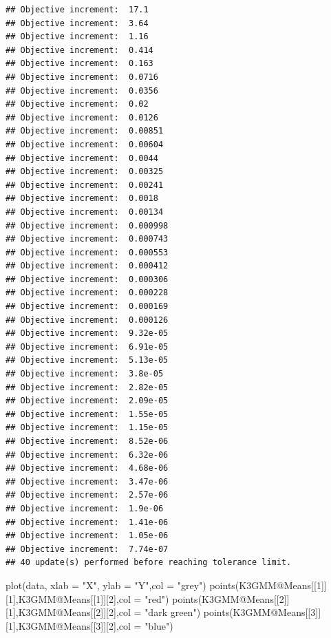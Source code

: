 \documentclass[
]{article}
\newenvironment{Shaded}{\begin{snugshade}}{\end{snugshade}}
\newcommand{\AttributeTok}[1]{\textcolor[rgb]{0.77,0.63,0.00}{#1}}
\newcommand{\DecValTok}[1]{\textcolor[rgb]{0.00,0.00,0.81}{#1}}
\newcommand{\FunctionTok}[1]{\textcolor[rgb]{0.00,0.00,0.00}{#1}}
\newcommand{\NormalTok}[1]{#1}
\newcommand{\SpecialCharTok}[1]{\textcolor[rgb]{0.00,0.00,0.00}{#1}}
\newcommand{\StringTok}[1]{\textcolor[rgb]{0.31,0.60,0.02}{#1}}
\begin{document}
\begin{verbatim}
## Objective increment:  17.1 
## Objective increment:  3.64 
## Objective increment:  1.16 
## Objective increment:  0.414 
## Objective increment:  0.163 
## Objective increment:  0.0716 
## Objective increment:  0.0356 
## Objective increment:  0.02 
## Objective increment:  0.0126 
## Objective increment:  0.00851 
## Objective increment:  0.00604 
## Objective increment:  0.0044 
## Objective increment:  0.00325 
## Objective increment:  0.00241 
## Objective increment:  0.0018 
## Objective increment:  0.00134 
## Objective increment:  0.000998 
## Objective increment:  0.000743 
## Objective increment:  0.000553 
## Objective increment:  0.000412 
## Objective increment:  0.000306 
## Objective increment:  0.000228 
## Objective increment:  0.000169 
## Objective increment:  0.000126 
## Objective increment:  9.32e-05 
## Objective increment:  6.91e-05 
## Objective increment:  5.13e-05 
## Objective increment:  3.8e-05 
## Objective increment:  2.82e-05 
## Objective increment:  2.09e-05 
## Objective increment:  1.55e-05 
## Objective increment:  1.15e-05 
## Objective increment:  8.52e-06 
## Objective increment:  6.32e-06 
## Objective increment:  4.68e-06 
## Objective increment:  3.47e-06 
## Objective increment:  2.57e-06 
## Objective increment:  1.9e-06 
## Objective increment:  1.41e-06 
## Objective increment:  1.05e-06 
## Objective increment:  7.74e-07 
## 40 update(s) performed before reaching tolerance limit.
\end{verbatim}

\begin{Shaded}
\begin{Highlighting}[]
\FunctionTok{plot}\NormalTok{(data, }\AttributeTok{xlab =} \StringTok{"X"}\NormalTok{, }\AttributeTok{ylab =} \StringTok{"Y"}\NormalTok{,}\AttributeTok{col =} \StringTok{"grey"}\NormalTok{)}
\FunctionTok{points}\NormalTok{(K3GMM}\SpecialCharTok{@}\NormalTok{Means[[}\DecValTok{1}\NormalTok{]][}\DecValTok{1}\NormalTok{],K3GMM}\SpecialCharTok{@}\NormalTok{Means[[}\DecValTok{1}\NormalTok{]][}\DecValTok{2}\NormalTok{],}\AttributeTok{col =} \StringTok{"red"}\NormalTok{)}
\FunctionTok{points}\NormalTok{(K3GMM}\SpecialCharTok{@}\NormalTok{Means[[}\DecValTok{2}\NormalTok{]][}\DecValTok{1}\NormalTok{],K3GMM}\SpecialCharTok{@}\NormalTok{Means[[}\DecValTok{2}\NormalTok{]][}\DecValTok{2}\NormalTok{],}\AttributeTok{col =} \StringTok{"dark green"}\NormalTok{)}
\FunctionTok{points}\NormalTok{(K3GMM}\SpecialCharTok{@}\NormalTok{Means[[}\DecValTok{3}\NormalTok{]][}\DecValTok{1}\NormalTok{],K3GMM}\SpecialCharTok{@}\NormalTok{Means[[}\DecValTok{3}\NormalTok{]][}\DecValTok{2}\NormalTok{],}\AttributeTok{col =} \StringTok{"blue"}\NormalTok{)}
\end{Highlighting}
\end{Shaded}
\end{document}
